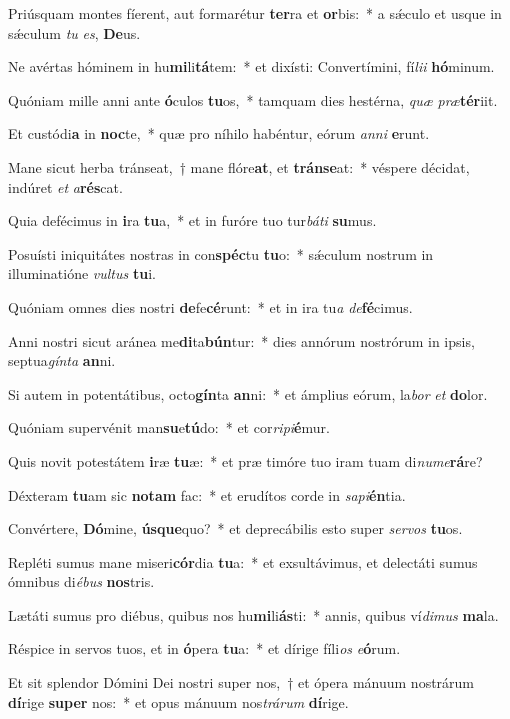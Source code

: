 \item Priúsquam montes fíerent, aut formarétur \textbf{ter}ra et \textbf{or}bis:~* a sǽculo et usque in sǽculum \textit{tu} \textit{es}, \textbf{De}us.
\item Ne avértas hóminem in hu\textbf{mi}li\textbf{tá}tem:~* et dixísti: Convertímini, fí\textit{li}\textit{i} \textbf{hó}minum.
\item Quóniam mille anni ante \textbf{ó}culos \textbf{tu}os,~* tamquam dies hestérna, \textit{quæ} \textit{præ}\textbf{tér}iit.
\item Et custódi\textbf{a} in \textbf{noc}te,~* quæ pro níhilo habéntur, eórum \textit{an}\textit{ni} \textbf{e}runt.
\item Mane sicut herba tránseat,~† mane flóre\textbf{at}, et \textbf{tráns}\textbf{e}at:~* véspere décidat, indúret \textit{et} \textit{a}\textbf{rés}cat.
\item Quia defécimus in \textbf{i}ra \textbf{tu}a,~* et in furóre tuo tur\textit{bá}\textit{ti} \textbf{su}mus.
\item Posuísti iniquitátes nostras in con\textbf{spéc}tu \textbf{tu}o:~* sǽculum nostrum in illuminatióne \textit{vul}\textit{tus} \textbf{tu}i.
\item Quóniam omnes dies nostri \textbf{de}fe\textbf{cé}runt:~* et in ira tu\textit{a} \textit{de}\textbf{fé}cimus.
\item Anni nostri sicut aránea me\textbf{di}ta\textbf{bún}tur:~* dies annórum nostrórum in ipsis, septua\textit{gín}\textit{ta} \textbf{an}ni.
\item Si autem in potentátibus, octo\textbf{gín}ta \textbf{an}ni:~* et ámplius eórum, la\textit{bor} \textit{et} \textbf{do}lor.
\item Quóniam supervénit man\textbf{su}e\textbf{tú}do:~* et cor\textit{ri}\textit{pi}\textbf{é}mur.
\item Quis novit potestátem \textbf{i}ræ \textbf{tu}æ:~* et præ timóre tuo iram tuam di\textit{nu}\textit{me}\textbf{rá}re?
\item Déxteram \textbf{tu}am sic \textbf{no}\textbf{tam} fac:~* et erudítos corde in \textit{sa}\textit{pi}\textbf{én}tia.
\item Convértere, \textbf{Dó}mine, \textbf{ús}\textbf{que}quo?~* et deprecábilis esto super \textit{ser}\textit{vos} \textbf{tu}os.
\item Repléti sumus mane miseri\textbf{cór}dia \textbf{tu}a:~* et exsultávimus, et delectáti sumus ómnibus di\textit{é}\textit{bus} \textbf{nos}tris.
\item Lætáti sumus pro diébus, quibus nos hu\textbf{mi}li\textbf{ás}ti:~* annis, quibus ví\textit{di}\textit{mus} \textbf{ma}la.
\item Réspice in servos tuos, et in \textbf{ó}pera \textbf{tu}a:~* et dírige fíli\textit{os} \textit{e}\textbf{ó}rum.
\item Et sit splendor Dómini Dei nostri super nos,~† et ópera mánuum nostrárum \textbf{dí}rige \textbf{su}\textbf{per} nos:~* et opus mánuum nos\textit{trá}\textit{rum} \textbf{dí}rige.
